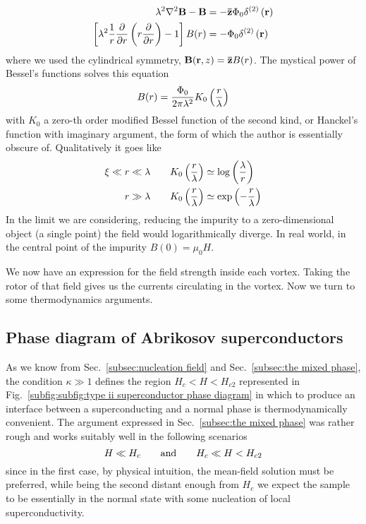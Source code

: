 \[
\begin{aligned}
    \lambda^2 \laplacian\mathbf{B} - \mathbf{B} &= - \versor{z}\Phi_0 \delta^{(2)}\lrR{\mathbf{r}} \\
    \lrS{\lambda^2 \frac{1}{r} \pdv{}{r} \lrR{r \pdv{}{r}} - 1} B(r) &= - \Phi_0 \delta^{(2)}\lrR{\mathbf{r}}
\end{aligned}
\]
where we used the cylindrical symmetry, $\mathbf{B}(\mathbf{r},z)=\mathbf{\bar{z}}B(r)$. The mystical power of Bessel's functions solves this equation
\begin{equation}\label{eq:field inside a vortex}
    B(r) = \frac{\Phi_0}{2\pi \lambda^2} K_0 \left({\frac{r}{\lambda}}\right)
\end{equation}
with $K_0$ a zero-th order modified Bessel function of the second kind, or Hanckel's function with imaginary argument, the form of which the author is essentially obscure of. Qualitatively it goes like
\[
\begin{aligned}
    \xi\ll\;&r\ll\lambda \quad&&K_0\left({\frac{r}{\lambda}}\right) \simeq \log\left({\frac{\lambda}{r}}\right) \\
    &r\gg\lambda \quad&&K_0\left({\frac{r}{\lambda}}\right) \simeq \exp\left({-\frac{r}{\lambda}}\right)
\end{aligned}
\]
In the limit we are considering, reducing the impurity to a zero-dimensional object (a single point) the field would logarithmically diverge. In real world, in the central point of the impurity $B(0)=\mu_0 H$.

%     

We now have an expression for the field strength inside each vortex. Taking the rotor of that field gives us the currents circulating in the vortex. Now we turn to some thermodynamics arguments.

\subsection{Phase diagram of Abrikosov superconductors}\label{subsec:phase diagram of Abrikosov superconductors}

As we know from Sec.~\ref{subsec:nucleation field} and Sec.~\ref{subsec:the mixed phase}, the condition $\kappa\gg1$ defines the region $H_c < H < H_{c2}$ represented in Fig.~\ref{subfig:subfig:type ii superconductor phase diagram} in which to produce an interface between a superconducting and a normal phase is thermodynamically convenient. The argument expressed in Sec.~\ref{subsec:the mixed phase} was rather rough and works suitably well in the following scenarios
\[
    H \ll H_c
    \quad\qq{and}\quad
    H_c \ll H < H_{c2}
\]
since in the first case, by physical intuition, the mean-field solution must be preferred, while being the second distant enough from $H_c$ we expect the sample to be essentially in the normal state with some nucleation of local superconductivity.


